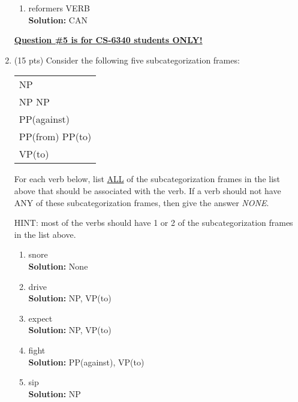 \documentclass[11pt]{article}
\begin{document}
\begin{enumerate}
\begin{enumerate}
\item reformers VERB \\
\textbf{Solution:} CAN\\
 
\end{enumerate}


\underline{\textbf{Question \#5 is for CS-6340 students ONLY!}}  \\

\item (15 pts) Consider the following five subcategorization frames:

\begin{center}
\begin{tabular}{|l|} \hline
NP  \\
NP NP \\
PP(against) \\
PP(from) PP(to) \\
VP(to) \\ \hline
\end{tabular}
\end{center}

For each verb below, list \underline{ALL} of the subcategorization
frames in the list above that should be associated with the verb. 
If a verb should not have ANY of these
subcategorization frames, then give the answer {\it NONE}.

\noindent
HINT: most of the verbs should have 1 or 2 of the subcategorization
frames in the list above.  \\

\begin{enumerate}

\item snore \\
\textbf{Solution:} None\\

\item drive  \\
\textbf{Solution:} NP, VP(to)\\

\item expect \\
\textbf{Solution:} NP, VP(to)\\

\item fight \\
\textbf{Solution:} PP(against), VP(to)\\

\item sip \\
\textbf{Solution:} NP\\


\end{enumerate}
\end{enumerate}
\end{document}
